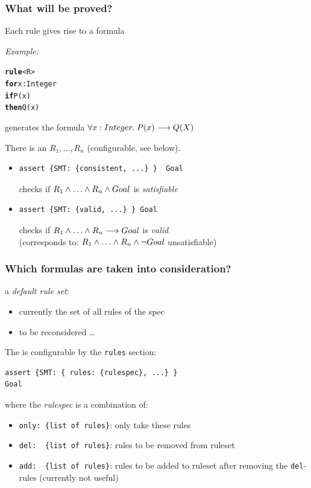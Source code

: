 \documentclass{beamer}
\begin{document}
\begin{frame}[fragile]\frametitle{What will be proved?}

   Each rule gives rise to a formula

  \emph{Example:}

\begin{alltt}  
  \textbf{rule} <R>
  \textbf{for} x : Integer
  \textbf{if} P(x)
  \textbf{then} Q(x)
\end{alltt}
generates the formula $\forall x: Integer.\; P(x) \longrightarrow Q(X)$

\vspace{3mm}

There is an  $R_1, \dots,  R_n$ (configurable, see below).

\begin{itemize}
\item 
\begin{verbatim}
assert {SMT: {consistent, ...} }  Goal
\end{verbatim}
checks if $R_1 \AND \dots \AND R_n \AND Goal$ is \emph{satisfiable}

\item 
\begin{verbatim}
assert {SMT: {valid, ...} } Goal
\end{verbatim}
checks if $R_1 \AND \dots \AND R_n \IMPL Goal$ is \emph{valid}\\
(corresponds to: $R_1 \AND \dots \AND R_n \AND \NOT Goal$ unsatisfiable)
  
\end{itemize}

\end{frame}


\begin{frame}[fragile]\frametitle{Which formulas are taken into
    consideration?}

   a \emph{default rule set}:
  \begin{itemize}
  \item currently the set of all rules of the spec
  \item to be reconsidered \dots
  \end{itemize}
  
  
The  is configurable by the \texttt{rules} section:
\begin{verbatim}
assert {SMT: { rules: {rulespec}, ...} }
Goal
\end{verbatim}

where the \emph{rulespec} is a combination of:
  \begin{itemize}
  \item \verb|only: {list of rules}|: only take these rules
  \item \verb|del:  {list of rules}|: rules to be removed from ruleset
  \item \verb|add:  {list of rules}|: rules to be added to ruleset after
    removing the \texttt{del}-rules (currently not useful)
  \end{itemize}

\end{frame}
\end{document}
